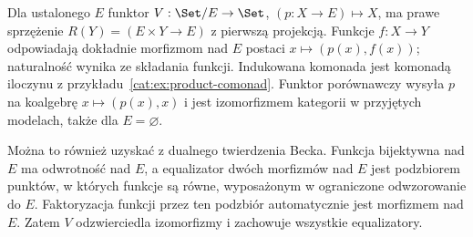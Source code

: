 \begin{przyklad}\label{cat:ex:beck-slice}
Dla ustalonego $E$ funktor $V:\Set/E\to\Set$, $(p:X\to E)\mapsto X$, ma prawe sprzężenie $R(Y)=(E\times Y\to E)$ z pierwszą projekcją. Funkcje $f:X\to Y$ odpowiadają dokładnie morfizmom nad $E$ postaci $x\mapsto(p(x),f(x))$; naturalność wynika ze składania funkcji. Indukowana komonada jest komonadą iloczynu z przykładu~\ref{cat:ex:product-comonad}. Funktor porównawczy wysyła $p$ na koalgebrę $x\mapsto(p(x),x)$ i jest izomorfizmem kategorii w przyjętych modelach, także dla $E=\varnothing$.

Można to również uzyskać z dualnego twierdzenia Becka. Funkcja bijektywna nad $E$ ma odwrotność nad $E$, a equalizator dwóch morfizmów nad $E$ jest podzbiorem punktów, w których funkcje są równe, wyposażonym w ograniczone odwzorowanie do $E$. Faktoryzacja funkcji przez ten podzbiór automatycznie jest morfizmem nad $E$. Zatem $V$ odzwierciedla izomorfizmy i zachowuje wszystkie equalizatory.
\end{przyklad}
